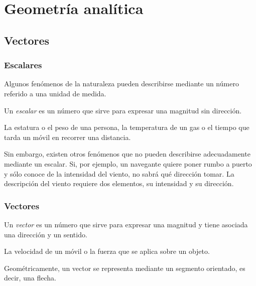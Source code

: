 \section{Geometría analítica}


\subsection{Vectores}

\begin{frame}
	\frametitle{Escalares}
	Algunos fenómenos de la naturaleza pueden describirse mediante un número referido a una unidad de medida. 
	
	\begin{definicion}[Escalar]
		Un \emph{escalar} es un número que sirve para expresar una magnitud sin dirección.
	\end{definicion}
	 La estatura o el peso de una persona, la temperatura de un gas o el tiempo que tarda un móvil en recorrer una distancia.
	
	Sin embargo, existen otros fenómenos que no pueden describirse adecuadamente mediante un escalar. 
	Si, por ejemplo, un navegante quiere poner rumbo a puerto y sólo conoce de la intensidad del viento, no sabrá qué dirección tomar. 
	La descripción del viento requiere dos elementos, su intensidad y su dirección. 
	
\end{frame}


\begin{frame}
	\frametitle{Vectores}
	\begin{definicion}[Vector]
		Un \emph{vector} es un número que sirve para expresar una magnitud y tiene asociada una dirección y un sentido. 
	\end{definicion}
	
	 La velocidad de un móvil o la fuerza que se aplica sobre un objeto.  
	 
	Geométricamente, un vector se representa mediante un segmento orientado, es decir, una flecha.  
	\begin{center}
		\scalebox{0.8}{}
	\end{center}
\end{frame}


